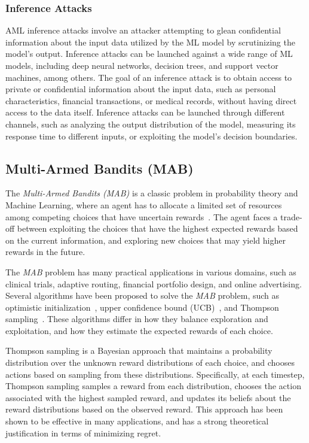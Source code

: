 \subsubsection{Inference Attacks}
AML inference attacks involve an attacker attempting to glean confidential information about the input data utilized
by the ML model by scrutinizing the model's output.
Inference attacks can be launched against a wide range of ML models, including deep neural networks, decision trees,
and support vector machines, among others.
The goal of an inference attack is to obtain access to private or confidential information about the input data, such
as personal characteristics, financial transactions, or medical records, without having direct access to the data itself.
Inference attacks can be launched through different channels, such as analyzing the output distribution of the model,
measuring its response time to different inputs, or exploiting the model's decision boundaries.


\subsection{Multi-Armed Bandits (MAB)}\label{subsec:back-multi-armed-bandit}
The \textit{Multi-Armed Bandits (MAB)} is a classic problem in probability theory and Machine Learning, where an agent
has to allocate a limited set of resources among competing choices that have uncertain
rewards~\cite{kuleshov2014algorithms}.
The agent faces a trade-off between exploiting the choices that have the highest expected rewards based on the current
information, and exploring new choices that may yield higher rewards in the future.

The \textit{MAB} problem has many practical applications in various domains, such as clinical trials, adaptive routing, financial
portfolio design, and online advertising.
Several algorithms have been proposed to solve the \textit{MAB} problem, such as optimistic initialization~\cite{machado2014domain},
upper confidence bound (UCB)~\cite{carpentier2011upper}, and Thompson sampling~\cite{agrawal2012analysis}.
These algorithms differ in how they balance exploration and exploitation, and how they estimate the expected rewards of
each choice.

Thompson sampling is a Bayesian approach that maintains a probability distribution over the unknown reward distributions
of each choice, and chooses actions based on sampling from these distributions.
Specifically, at each timestep, Thompson sampling samples a reward from each distribution, chooses the action associated
with the highest sampled reward, and updates its beliefs about the reward distributions based on the observed reward.
This approach has been shown to be effective in many applications, and has a strong theoretical justification in terms
of minimizing regret.

